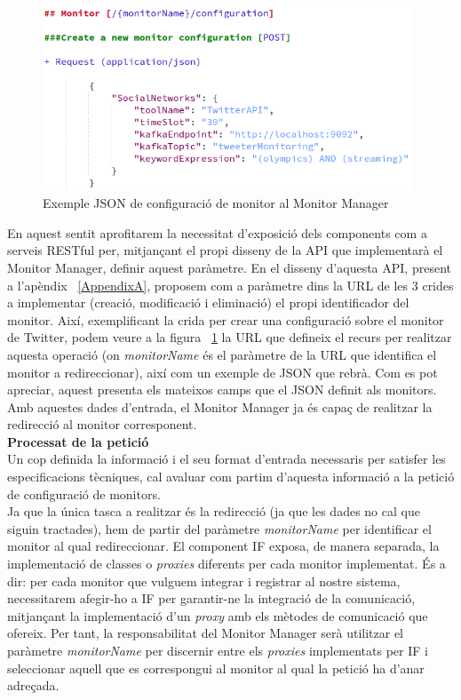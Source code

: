 \begin{figure}[!h]
\centering
\includegraphics[width=11cm]{Figures/Figure15}
\decoRule
\caption[Exemple JSON de configuració de monitor al Monitor Manager]{Exemple JSON de configuració de monitor al Monitor Manager}
\label{fig:Figura15}
\end{figure}

En aquest sentit aprofitarem la necessitat d'exposició dels components com a serveis RESTful per, mitjançant el propi disseny de la API que implementarà el Monitor Manager, definir aquest paràmetre. En el  disseny d'aquesta API, present a l'apèndix ~\ref{AppendixA}, proposem com a paràmetre dins la URL de les 3 crides a implementar (creació, modificació i eliminació) el propi identificador del monitor. Així, exemplificant la crida per crear una configuració sobre el monitor de Twitter, podem veure a la figura ~\ref{fig:Figura15} la URL que defineix el recurs per realitzar aquesta operació (on \textit{monitorName} és el paràmetre de la URL que identifica el monitor a redireccionar), així com un exemple de JSON que rebrà. Com es pot apreciar, aquest presenta els mateixos camps que el JSON definit als monitors.\\

Amb aquestes dades d'entrada, el Monitor Manager ja és capaç de realitzar la redirecció al monitor corresponent.\\

\noindent \textbf{\large Processat de la petició}\\

\noindent Un cop definida la informació i el seu format d'entrada necessaris per satisfer les especificacions tècniques, cal avaluar com partim d'aquesta informació a la petició de configuració de monitors.\\

Ja que la única tasca a realitzar és la redirecció (ja que les dades no cal que siguin tractades), hem de partir del paràmetre \textit{monitorName} per identificar el monitor al qual redireccionar. El component IF exposa, de manera separada, la implementació de classes o \textit{proxies} diferents per cada monitor implementat. És a dir: per cada monitor que vulguem integrar i registrar al nostre sistema, necessitarem afegir-ho a IF per garantir-ne la integració de la comunicació, mitjançant la implementació d'un \textit{proxy} amb els mètodes de comunicació que ofereix. Per tant, la responsabilitat del Monitor Manager serà utilitzar el paràmetre \textit{monitorName} per discernir entre els \textit{proxies} implementats per IF i seleccionar aquell que es correspongui al monitor al qual la petició ha d'anar adreçada. \\

